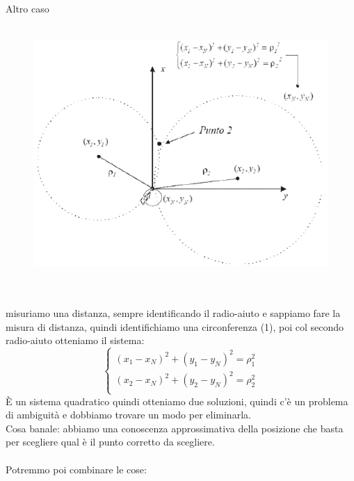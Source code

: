 \documentclass[oneside, 12pt]{extbook}
\begin{document}
Altro caso\\\\
\begin{figure}[!h]
	\includegraphics[scale=0.3]{immagini/localization/range_mes.png}
\end{figure}\\
\\misuriamo una distanza, sempre identificando il radio-aiuto e sappiamo fare la misura di distanza, quindi identifichiamo una circonferenza (1), poi col secondo radio-aiuto otteniamo il sistema:
\begin{equation}
	\begin{cases}
		(x_1 - x_N)^2 + (y_1 - y_N)^2 = \rho_1^2 \\
		(x_2 - x_N)^2 + (y_2 - y_N)^2 = \rho_2^2 \\
	\end{cases}
\end{equation}
È un sistema quadratico quindi otteniamo due soluzioni, quindi c'è un problema di ambiguità e dobbiamo trovare un modo per eliminarla.\\
Cosa banale: abbiamo una conoscenza approssimativa della posizione che basta per scegliere qual è il punto corretto da scegliere.\\\\
Potremmo poi combinare le cose:\\\\
\end{document}
